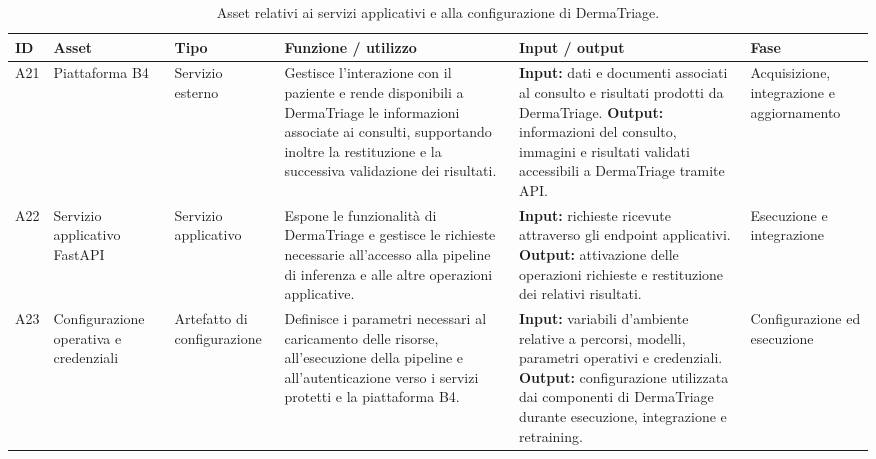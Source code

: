 \begin{table}[H]
    \centering
    \small
    \setlength{\tabcolsep}{4pt}
    \renewcommand{\arraystretch}{1.08}

    \begin{tabularx}{\textwidth}{
        >{\raggedright\arraybackslash}p{0.6cm}
        >{\raggedright\arraybackslash}p{2.5cm}
        >{\raggedright\arraybackslash}p{1.6cm}
        X
        X
        >{\raggedright\arraybackslash}p{1.8cm}
    }
        \toprule

        \textbf{ID} &
        \textbf{Asset} &
        \textbf{Tipo} &
        \textbf{Funzione / utilizzo} &
        \textbf{Input / output} &
        \textbf{Fase} \\

        \midrule

        A21 &
        Piattaforma B4 &
        Servizio esterno &
        Gestisce l'interazione con il paziente e rende disponibili a
        DermaTriage le informazioni associate ai consulti, supportando
        inoltre la restituzione e la successiva validazione dei risultati. &
        \textbf{Input:} dati e documenti associati al consulto e risultati
        prodotti da DermaTriage.
        \textbf{Output:} informazioni del consulto, immagini e risultati
        validati accessibili a DermaTriage tramite API. &
        Acquisizione, integrazione e aggiornamento \\

        \midrule

        A22 &
        Servizio applicativo FastAPI &
        Servizio applicativo &
        Espone le funzionalità di DermaTriage e gestisce le richieste
        necessarie all'accesso alla pipeline di inferenza e alle altre
        operazioni applicative. &
        \textbf{Input:} richieste ricevute attraverso gli endpoint
        applicativi.
        \textbf{Output:} attivazione delle operazioni richieste e
        restituzione dei relativi risultati. &
        Esecuzione e integrazione \\

        \midrule

        A23 &
        Configurazione operativa e credenziali &
        Artefatto di configurazione &
        Definisce i parametri necessari al caricamento delle risorse,
        all'esecuzione della pipeline e all'autenticazione verso i servizi
        protetti e la piattaforma B4. &
        \textbf{Input:} variabili d'ambiente relative a percorsi, modelli,
        parametri operativi e credenziali.
        \textbf{Output:} configurazione utilizzata dai componenti di
        DermaTriage durante esecuzione, integrazione e retraining. &
        Configurazione ed esecuzione \\

        \bottomrule
    \end{tabularx}

    \caption{Asset relativi ai servizi applicativi e alla configurazione di DermaTriage.}
    \label{tab:asset-servizi-configurazione}
\end{table}

\clearpage
